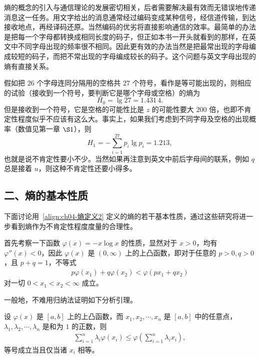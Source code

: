 \documentclass[../../main.tex]{subfiles}
\begin{document}
\begin{example}[英文字母出现的熵]\label{example:ch04-英文字母熵}
熵的概念的引入与通信理论的发展密切相关，后者需要解决最有效而无错误地传递消息这一任务。用文字给出的消息通常经过编码变成某种信号，经信道传输，到达接收地点，再经译码还原。当然编码的优劣将直接影响通信的效率。最简单的办法是把每一个字母都转换成相同长度的码子，但正如本书一开头就看到的那样，在英文中不同字母出现的频率很不相同。因此更有效的办法当然是把最常出现的字母编成较短的码子，而把不常出现的字母编成较长的码子。这个问题与英文字母出现的熵有直接关系。

假如把 $26$ 个字母连同分隔用的空格共 $27$ 个符号，看作是等可能出现的，则相应的试验（接收到一个符号，要判断它是哪个字母或空格）的熵为
\[
H_0=\lg 27=1.431\,4.
\]
但是接收到一个符号，它是空格的可能性比是 $z$ 的可能性要大 $200$ 倍，也即不肯定性程度似乎不应该有这么大。事实上，如果我们考虑到不同字母及空格的出现概率（数值见第一章 $\S 1$），则
\[
H_1=-\sum_{i=1}^{27}p_i\lg p_i=1.213,
\]
也就是说不肯定性要小不少。当然如果再注意到英文中前后字母间的联系，例如 $q$ 总是接着 $u$，则这种不肯定性还要小得多。
\end{example}

\subsection*{二、熵的基本性质}

下面讨论用~\eqref{align:ch04-熵定义2} 定义的熵的若干基本性质，通过这些研究将进一步看到熵作为不肯定性程度度量的合理性。

首先考察一下函数 $\varphi(x)=-x\log x$ 的性质，显然对于 $x>0$，均有 $\varphi''(x)<0$，因此 $\varphi(x)$ 是 $(0,\infty)$ 上的上凸函数，即对于任意的 $p>0,q>0$，且 $p+q=1$，不等式
\begin{align}
p\varphi(x_1)+q\varphi(x_2)<\varphi(px_1+qx_2)\label{align:ch04-上凸}
\end{align}
对一切 $0<x_1<x_2<\infty$ 成立。

一般地，不难用归纳法证明如下分析引理。

\begin{lemma}\label{lemma:ch04-Jensen}
设 $\varphi(x)$ 是 $[a,b]$ 上的上凸函数，而 $x_1,x_2,\cdots,x_n$ 是 $[a,b]$ 中的任意点，$\lambda_1,\lambda_2,\cdots,\lambda_n$ 是和为 $1$ 的正数，则
\begin{align}
\sum_{i=1}^n\lambda_i\varphi(x_i)\leqslant\varphi\left(\sum_{i=1}^n\lambda_i x_i\right),\label{align:ch04-Jensen}
\end{align}
等号成立当且仅当诸 $x_i$ 相等。
\end{lemma}
\end{document}

